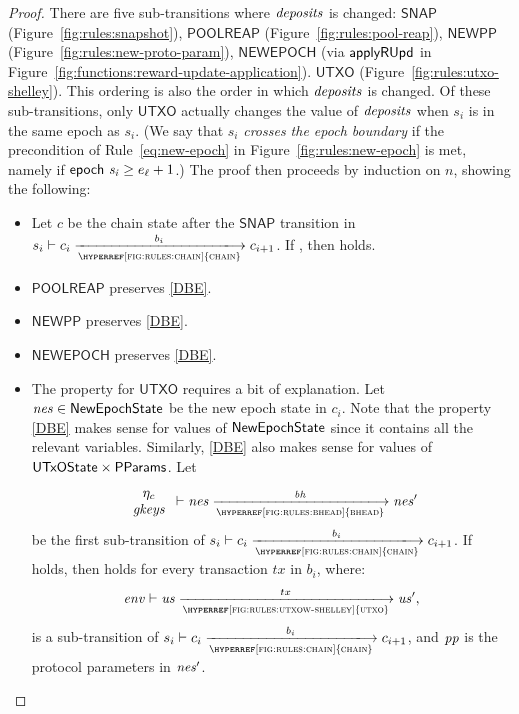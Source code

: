 \begin{proof}
  There are five sub-transitions where $\mathit{deposits}$ is changed:
  $\mathsf{SNAP}$ (Figure~\ref{fig:rules:snapshot}),
  $\mathsf{POOLREAP}$ (Figure~\ref{fig:rules:pool-reap}),
  $\mathsf{NEWPP}$ (Figure~\ref{fig:rules:new-proto-param}),
  $\mathsf{NEWEPOCH}$ (via $\mathsf{applyRUpd}$ in Figure~\ref{fig:functions:reward-update-application}).
  $\mathsf{UTXO}$ (Figure~\ref{fig:rules:utxo-shelley}).
  This ordering is also the order in which $\mathit{deposits}$ is changed.
  Of these sub-transitions, only $\mathsf{UTXO}$ actually changes the value of $\mathit{deposits}$
  when $s_i$ is in the same epoch as $s_i$.
  (We say that $s_i$ \emph{crosses the epoch boundary} if the precondition of
  Rule~\ref{eq:new-epoch} in Figure~\ref{fig:rules:new-epoch} is met,
  namely if $\mathsf{epoch}~ \mathit{s_i} \ge e_\ell+1$.)
%
  The proof then proceeds by induction on $n$, showing the following:
  \begin{itemize}
    \item
      Let $c$ be the chain state after the $\mathsf{SNAP}$ transition
      in $s_i\vdash c_i\trans{\hyperref[fig:rules:chain]{chain}}{b_i}c_{i+1}$.
      If , then  holds.
    \item $\mathsf{POOLREAP}$ preserves \ref{DBE}.
    \item $\mathsf{NEWPP}$ preserves \ref{DBE}.
    \item $\mathsf{NEWEPOCH}$ preserves \ref{DBE}.
    \item The property for $\mathsf{UTXO}$ requires a bit of explanation.
      Let $\mathit{nes}\in\mathsf{NewEpochState}$ be the new epoch state in $c_i$.
      Note that the property \ref{DBE} makes sense for values of $\mathsf{NewEpochState}$
      since it contains all the relevant variables.
      Similarly, \ref{DBE} also makes sense for values of $\mathsf{UTxOState}\times\mathsf{PParams}$.
      Let
      $$
        {\begin{array}{c}
           \eta_c \\
           \var{gkeys} \\
         \end{array}}
        \vdash\var{nes}\trans{\hyperref[fig:rules:bhead]{bhead}}{\var{bh}}\var{nes'}
      $$
      be the first sub-transition of
      $s_i\vdash c_i\trans{\hyperref[fig:rules:chain]{chain}}{b_i}c_{i+1}$.
      If  holds, then  holds for every transaction
      $tx$ in $b_i$, where:
      $$
      \var{env}\vdash \var{us} \trans{\hyperref[fig:rules:utxow-shelley]{utxo}}{tx} \var{us'},
      $$
      is a sub-transition of
      $s_i\vdash c_i\trans{\hyperref[fig:rules:chain]{chain}}{b_i}c_{i+1}$,
      and $\mathit{pp}$ is the protocol parameters in $\mathit{nes'}$.
  \end{itemize}


\end{proof}
